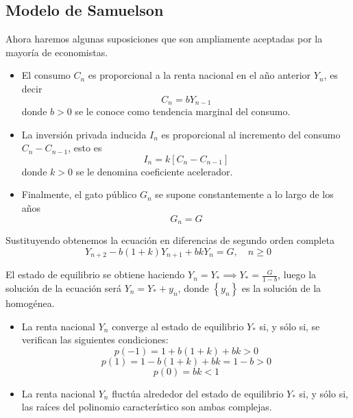 \documentclass[a4paper, 12pt]{article}
\theoremstyle{plain}
\theoremstyle{definition}
\theoremstyle{remark}
\begin{document}
	\subsection{Modelo de Samuelson}
	Ahora haremos algunas suposiciones que son ampliamente aceptadas por la mayoría de economistas.
	\begin{itemize}
		\item El consumo $C_n$ es proporcional a la renta nacional en el año anterior $Y_n$, es decir
		\[C_n=bY_{n-1}\]
		donde $b>0$ se le conoce como tendencia marginal del consumo.
		\item La inversión privada inducida $I_n$ es proporcional al incremento del consumo $C_n-C_{n-1}$, esto es
		\[I_n=k\left[C_n-C_{n-1}\right] \]
		donde $k>0$ se le denomina coeficiente acelerador.
		\item Finalmente, el gato público $G_n$ se supone constantemente a lo largo de los años \[G_n=G\]
	\end{itemize}
	
	Sustituyendo obtenemos la ecuación en diferencias de segundo orden completa \[Y_{n+2}-b(1+k)Y_{n+1}+bkY_n=G, \quad n\geq 0\]
	
	El estado de equilibrio se obtiene haciendo $Y_n=Y_*\implies Y_*=\frac{G}{1-b}$, luego la solución de la ecuación será $Y_n=Y_*+y_n$, donde $\left\{y_n\right\}$ es la solución de la homogénea.
	
	\begin{itemize}
		\item La renta nacional $Y_n$ converge al estado de equilibrio $Y_*$ si, y sólo si, se verifican las siguientes condiciones:
		\[p(-1)=1+b(1+k)+bk>0 \]
		\[p(1)=1-b(1+k)+bk=1-b >0 \]
		\[p(0) = bk <1\]
		
		\item La renta nacional $Y_n$ fluctúa alrededor del estado de equilibrio $Y_*$ si, y sólo si, las raíces del polinomio característico son ambas complejas.
	\end{itemize}
\end{document}
